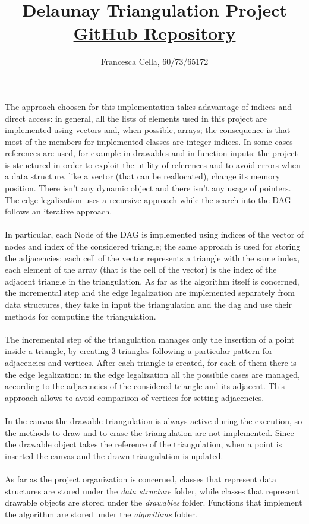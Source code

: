 \documentclass[12pt]{article}
\title{Delaunay Triangulation Project\\\href{https://github.com/UNICAAS2/as2-project-Frac7}{\small{GitHub Repository}}}
\author{Francesca Cella, 60/73/65172}
\date{}
\begin{document}
\maketitle

The approach choosen for this implementation takes adavantage of indices and direct access: in general, all the lists of elements used in this project are implemented using vectors and, when possible, arrays; the consequence is that most of the members for implemented classes are integer indices. In some cases references are used, for example in drawables and in function inputs: the project is structured in order to exploit the utility of references and to avoid errors when a data structure, like a vector (that can be reallocated), change its memory position. There isn’t any dynamic object and there isn’t any usage of pointers. The edge legalization uses a recursive approach while the search into the DAG follows an iterative approach.\\\\
In particular, each Node of the DAG is implemented using indices of the vector of nodes and index of the considered triangle; the same approach is used for storing the adjacencies: each cell of the vector represents a triangle with the same index, each element of the array (that is the cell of the vector) is the index of the adjacent triangle in the triangulation.
As far as the algorithm itself is concerned, the incremental step and the edge legalization are implemented separately from data structures, they take in input the triangulation and the dag and use their methods for computing the triangulation.\\\\
The incremental step of the triangulation manages only the insertion of a point inside a triangle, by creating 3 triangles following a particular pattern for adjacencies and vertices. After each triangle is created, for each of them there is the edge legalization: in the edge legalization all the possibile cases are managed, according to the adjacencies of the considered triangle and its adjacent. This approach allows to avoid comparison of vertices for setting adjacencies.\\\\
In the canvas the drawable triangulation is always active during the execution, so the methods to draw and to erase the triangulation are not implemented. Since the drawable object takes the reference of the triangulation, when a point is inserted the canvas and the drawn triangulation is updated.\\\\
As far as the project organization is concerned, classes that represent data structures are stored under the \textit{data structure} folder, while classes that represent drawable objects are stored under the \textit{drawables} folder. Functions that implement the algorithm are stored under the \textit{algorithms} folder.
\end{document}
